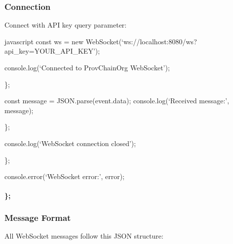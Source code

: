 \documentclass[letterpaper,10pt,english]{sphinxmanual}
\begin{document}
\subsubsection{Connection}
\label{\detokenize{api/websocket-api:connection}}
\sphinxAtStartPar
{} 

\sphinxAtStartPar
{}
Connect with API key query parameter:

\sphinxAtStartPar
{}
{\color{red}\bfseries{}\textasciigrave{}\textasciigrave{}}{\color{red}\bfseries{}\textasciigrave{}}javascript
const ws = new WebSocket(‘ws://localhost:8080/ws?api\_key=YOUR\_API\_KEY’);
\begin{description}
\sphinxAtStartPar
console.log(‘Connected to ProvChainOrg WebSocket’);

\end{description}

\sphinxAtStartPar
\};
\begin{description}
\sphinxAtStartPar
const message = JSON.parse(event.data);
console.log(‘Received message:’, message);

\end{description}

\sphinxAtStartPar
\};
\begin{description}
\sphinxAtStartPar
console.log(‘WebSocket connection closed’);

\end{description}

\sphinxAtStartPar
\};
\begin{description}
\sphinxAtStartPar
console.error(‘WebSocket error:’, error);

\end{description}


\paragraph{\};}
\label{\detokenize{api/websocket-api:id5}}

\subsubsection{Message Format}
\label{\detokenize{api/websocket-api:message-format}}
\sphinxAtStartPar
All WebSocket messages follow this JSON structure:
\end{document}
